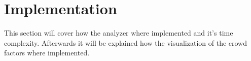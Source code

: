 \section{Implementation}
This section will cover how the analyzer where implemented and it's time complexity. Afterwards it will be explained how the visualization of the crowd factors where implemented.



